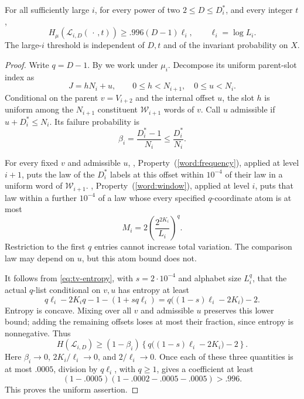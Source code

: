 \begin{proposition}\label{prop:window-entropy}
For all sufficiently large $i$, for every power of two
$2\le D\le D_i^*$, and every integer $t$,
\begin{equation}\label{eq:window-entropy}
 H_\mu(\mathcal L_{i,D}(\,\cdot\,,t))
 \ge .996(D-1)\ell_i,\qquad \ell_i=\log L_i.
\end{equation}
The large-$i$ threshold is independent of $D,t$ and of the
invariant probability on $X$.
\end{proposition}

\begin{proof}
Write $q=D-1$. By  we work under $\mu_i$.
Decompose its uniform parent-slot index as
\[
 J=hN_i+u,\qquad 0\le h<N_{i+1},\quad 0\le u<N_i.
\]
Conditional on the parent $v=V_{i+2}$ and the internal offset $u$,
the slot $h$ is uniform among the $N_{i+1}$ constituent
$\mathcal W_{i+1}$ words of $v$.
Call $u$ admissible if $u+D_i^*\le N_i$.
Its failure probability is
\[
 \beta_i=\frac{D_i^*-1}{N_i}\le\frac{D_i^*}{N_i}.
\]

For every fixed $v$ and admissible $u$,
, Property~(\ref{word:frequency}), applied at level $i+1$,
puts the law of the $D_i^*$ labels at this offset within
$10^{-4}$ of their law in a uniform word of $\mathcal W_{i+1}$.
, Property~(\ref{word:window}), applied at level $i$,
puts that law within a further $10^{-4}$ of a law whose
every specified $q$-coordinate atom is at most
\[
 M_i=2\left(\frac{2^{2K_i}}{L_i}\right)^q.
\]
Restriction to the first $q$ entries cannot increase total
variation. The comparison law may depend on $u$, but this
atom bound does not.

It follows from \eqref{eq:tv-entropy}, with $s=2\cdot10^{-4}$
and alphabet size $L_i^q$, that the actual $q$-list conditional
on $v,u$ has entropy at least
\[
 q\ell_i-2K_iq-1-(1+sq\ell_i)
 =q\bigl((1-s)\ell_i-2K_i\bigr)-2.
\]
Entropy is concave. Mixing over all $v$ and admissible $u$
preserves this lower bound; adding the remaining offsets loses
at most their fraction, since entropy is nonnegative. Thus
\begin{equation}\label{eq:window-entropy-explicit}
 H(\mathcal L_{i,D})
 \ge(1-\beta_i)
       \left\{q\bigl((1-s)\ell_i-2K_i\bigr)-2\right\}.
\end{equation}
Here $\beta_i\to0$, $2K_i/\ell_i\to0$, and $2/\ell_i\to0$.
Once each of these three quantities is at most $.0005$,
division by $q\ell_i$, with $q\ge1$, gives a coefficient
at least
\[
 (1-.0005)(1-.0002-.0005-.0005)>.996.
\]
This proves the uniform assertion.
\end{proof}


